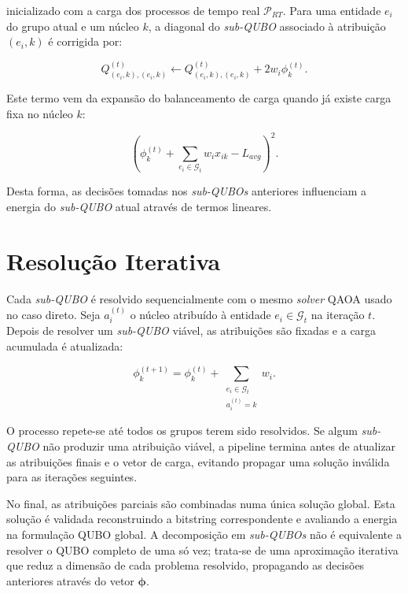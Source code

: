 inicializado com a carga dos processos de tempo real $\mathcal{P}_{RT}$. Para uma entidade
$e_i$ do grupo atual e um núcleo $k$, a diagonal do \textit{sub-QUBO} associado à atribuição
$(e_i,k)$ é corrigida
por:

\begin{equation}
    Q^{(t)}_{(e_i,k),(e_i,k)}
    \leftarrow
    Q^{(t)}_{(e_i,k),(e_i,k)}
    +
    2w_i\phi^{(t)}_k.
\end{equation}

Este termo vem da expansão do balanceamento de carga quando já existe carga fixa
no núcleo $k$:

\begin{equation}
    \left(\phi^{(t)}_k + \sum_{e_i \in \mathcal{G}_t} w_i x_{ik} - L_{avg}\right)^2.
\end{equation}

Desta forma, as decisões tomadas nos \textit{sub-QUBOs} anteriores influenciam a
energia do \textit{sub-QUBO} atual através de termos lineares.

\section{Resolução Iterativa}
\label{sec:resolucao-iterativa-subqubo}

Cada \textit{sub-QUBO} é resolvido sequencialmente com o mesmo \textit{solver}
\acs{QAOA} usado no caso direto. Seja $a_i^{(t)}$ o núcleo atribuído à entidade
$e_i \in \mathcal{G}_t$ na iteração $t$. Depois de resolver um
\textit{sub-QUBO} viável, as atribuições são fixadas e a carga acumulada é
atualizada:

\begin{equation}
    \phi^{(t+1)}_k =
    \phi^{(t)}_k
    +
    \sum_{\substack{e_i \in \mathcal{G}_t \\ a_i^{(t)} = k}} w_i.
\end{equation}

O processo repete-se até todos os grupos terem sido resolvidos. Se algum
\textit{sub-QUBO} não produzir uma atribuição viável, a pipeline termina antes
de atualizar as atribuições finais e o vetor de carga, evitando propagar uma
solução inválida para as iterações seguintes.

No final, as atribuições parciais são combinadas numa única solução global. Esta
solução é validada reconstruindo a bitstring correspondente e avaliando a energia
na formulação \acs{QUBO} global. A decomposição em \textit{sub-QUBOs} não é
equivalente a resolver o \acs{QUBO} completo de uma só vez; trata-se de uma
aproximação iterativa que reduz a dimensão de cada problema resolvido, propagando
as decisões anteriores através do vetor $\boldsymbol{\phi}$.

